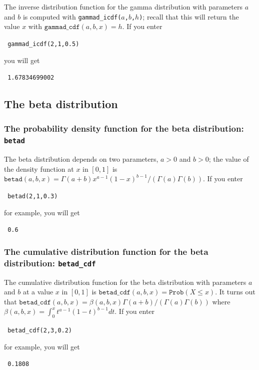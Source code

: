 \documentclass[a4paper,11pt]{book}
\begin{document}
The inverse distribution function for the gamma
distribution with parameters $a$ and $b$ is computed with
\texttt{gammad\_icdf($a$,$b$,$h$)}; recall that this will return the
value $x$ with $\texttt{gammad\_cdf}(a,b,x) = h$.  If you enter
\begin{center}
  \tt
  gammad\_icdf(2,1,0.5)
\end{center}
you will get
\begin{center}
  \tt
  1.67834699002
\end{center}

\subsection{The beta distribution}

\subsubsection{The probability density function for the beta distribution: \texttt{betad}}

The beta distribution depends on two parameters, $a>0$ and $b>0$; the
value of the density function at $x$ in $[0,1]$ is
$\texttt{betad}(a,b,x) =
\Gamma(a+b)x^{a-1}(1-x)^{b-1}/(\Gamma(a)\Gamma(b))$. If you enter
\begin{center}
  \tt
  betad(2,1,0.3)
\end{center}
for example, you will get
\begin{center}
  \tt
  0.6
\end{center}

\subsubsection{The cumulative distribution function for the beta distribution: \texttt{betad\_cdf}}

The cumulative distribution function for the beta distribution with
parameters $a$ and $b$ at a value $x$ in $[0,1]$ is
$\texttt{betad\_cdf}(a,b,x) = \texttt{Prob}(X \le x)$.  It turns out
that $\texttt{betad\_cdf}(a,b,x) =
\beta(a,b,x)\Gamma(a+b)/(\Gamma(a)\Gamma(b))$ where
$\beta(a,b,x) = \int_0^x t^{a-1}(1-t)^{b-1} dt$.  
If you
enter
\begin{center}
  \tt
  betad\_cdf(2,3,0.2)
\end{center}
for example, you will get
\begin{center}
  \tt
  0.1808
\end{center}
\end{document}
